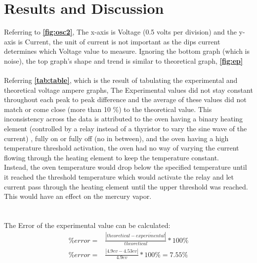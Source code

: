 \documentclass[12pt]{article}
\newcommand{\mycomment}[1]{}
\begin{document}
\mycomment{
\begin{figure}
    \centering
    \subfigure(a){\texttt{[image: oven]}}
	\subfigure(b){\texttt{[image: ControlUnit]}}
    \subfigure(c){\texttt{[image: Osc]}}
    \caption{(a) blah (b) blah (c) blah (d) blah}
    \label{fig:foobar}
\end{figure}
}

\section{Results and Discussion}
Referring to \textbf{\autoref{fig:osc2}}, The x-axis is Voltage (0.5 volts per division)
and the y-axis is Current, the unit of current is not important as the dips current determines which Voltage value to measure.
Ignoring the bottom graph (which is noise), the top graph's shape and trend is similar to theoretical graph,
\textbf{\autoref{fig:ep}}
\\
\\
Referring \textbf{\autoref{tab:table}}, which is the result of tabulating the experimental and theoretical voltage ampere graphs,
The Experimental values did not stay constant throughout each peak to peak difference and the average of these values did not match or come close (more than 10 \%) to the theoretical value.
This inconsistency across the data is attributed to the oven having a binary heating element (controlled by a relay instead of a thyristor to vary the sine wave of the current)
, fully on or fully off (no in between),
and the oven having a high temperature threshold activation, the oven had no way of varying the current
flowing through the heating element to keep the temperature constant.
\\
Instead, the oven temperature would drop below the specified temperature until it reached
the threshold temperature which would activate the relay and let current pass through the heating element until the upper threshold was reached. This would
have an effect on the mercury vapor.
\\
\\
\\ The Error of the experimental value can be calculated:
\begin{equation}
    \label{eq:error}
    \begin{split}
        \%error = & \frac{|theoretical - \overline{experimental}|}{theoretical} * 100\% \\
        \%error = & \frac{|4.9ev - 4.53ev|}{4.9ev} * 100\% = 7.55\%
    \end{split}
\end{equation}
\end{document}
